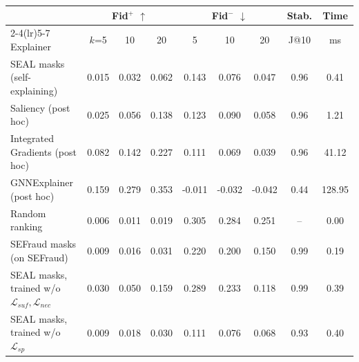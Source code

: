 \begin{tabular}{lcccccccc}
\toprule
 & \multicolumn{3}{c}{Fid$^{+}$ $\uparrow$} & \multicolumn{3}{c}{Fid$^{-}$ $\downarrow$} & Stab. & Time\\
\cmidrule(lr){2-4}\cmidrule(lr){5-7}
Explainer & $k$=5 & 10 & 20 & 5 & 10 & 20 & J@10 & ms\\
\midrule
SEAL masks (self-explaining) & 0.015 & 0.032 & 0.062 & 0.143 & 0.076 & 0.047 & 0.96 & 0.41\\
Saliency (post hoc) & 0.025 & 0.056 & 0.138 & 0.123 & 0.090 & 0.058 & 0.96 & 1.21\\
Integrated Gradients (post hoc) & 0.082 & 0.142 & 0.227 & 0.111 & 0.069 & 0.039 & 0.96 & 41.12\\
GNNExplainer (post hoc) & 0.159 & 0.279 & 0.353 & -0.011 & -0.032 & -0.042 & 0.44 & 128.95\\
Random ranking & 0.006 & 0.011 & 0.019 & 0.305 & 0.284 & 0.251 & -- & 0.00\\
SEFraud masks (on SEFraud) & 0.009 & 0.016 & 0.031 & 0.220 & 0.200 & 0.150 & 0.99 & 0.19\\
SEAL masks, trained w/o $\mathcal{L}_{suf},\mathcal{L}_{nec}$ & 0.030 & 0.050 & 0.159 & 0.289 & 0.233 & 0.118 & 0.99 & 0.39\\
SEAL masks, trained w/o $\mathcal{L}_{sp}$ & 0.009 & 0.018 & 0.030 & 0.111 & 0.076 & 0.068 & 0.93 & 0.40\\
\bottomrule
\end{tabular}

